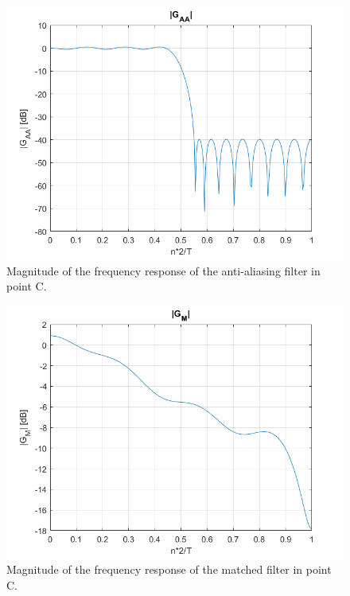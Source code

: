 \documentclass[a4paper,11.5pt]{article}
\begin{document}
\begin{figure}[ht]
	\begin{center}   
		\includegraphics[width=\textwidth]{figs/GAA.png} 
		\caption{Magnitude of the frequency response of the anti-aliasing filter in point C.}
		\label{fig:C_gaa}
	\end{center}
\end{figure}

\begin{figure}[ht]
	\begin{center}   
		\includegraphics[width=\textwidth]{figs/GM_CD.png} 
		\caption{Magnitude of the frequency response of the matched filter in point C.}
		\label{fig:C_gm}
	\end{center}
\end{figure}
\end{document}
